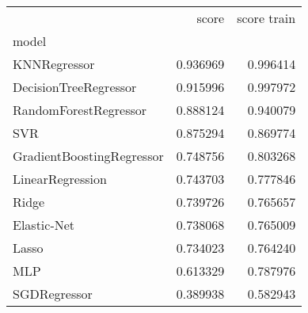 \begin{tabular}{lrr}
\toprule
{} &     score &  score train \\
model                     &           &              \\
\midrule
KNNRegressor              &  0.936969 &     0.996414 \\
DecisionTreeRegressor     &  0.915996 &     0.997972 \\
RandomForestRegressor     &  0.888124 &     0.940079 \\
SVR                       &  0.875294 &     0.869774 \\
GradientBoostingRegressor &  0.748756 &     0.803268 \\
LinearRegression          &  0.743703 &     0.777846 \\
Ridge                     &  0.739726 &     0.765657 \\
Elastic-Net               &  0.738068 &     0.765009 \\
Lasso                     &  0.734023 &     0.764240 \\
MLP                       &  0.613329 &     0.787976 \\
SGDRegressor              &  0.389938 &     0.582943 \\
\bottomrule
\end{tabular}
